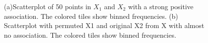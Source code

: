 \documentclass[12]{article}
\begin{document}
\begin{itemize}
\begin{figure}[hbtp]
{\label{type_1}
}
\label{plottype}
	\vspace{-.1in}
       \caption{(a)Scatterplot of 50 points in $X_1$ and $X_2$ with a strong positive association. The colored tiles show binned frequencies. (b) Scatterplot with permuted X1 and original X2 from X with almost no association. The colored tiles show binned frequencies.}
\end{figure}


\end{itemize}
\end{document}
